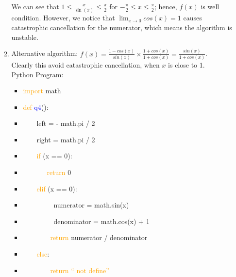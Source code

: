 \documentclass{article}
\begin{document}
\begin{enumerate}
\begin{enumerate}
\begin{center}
\begin{tikzpicture}[scale=1]
	\end{tikzpicture}
	\end{center} 
	We can see that  $ 1 \leq \frac{x}{\sin(x)} \leq \frac{\pi}{2}$ for $- \frac{\pi}{2} \leq x \leq \frac{\pi}{2}$; hence, $f(x)$ is well condition.
	However, we notice that $\lim_{x\to 0} cos(x) = 1$ causes catastrophic cancellation for the numerator, which means the algorithm is unstable.
	\item Alternative algorithm: $f(x) = \frac{1-cos(x)}{sin(x)} \times \frac{1+cos(x)}{1+cos(x)} = \frac{sin(x)}{1+cos(x)}$.\\
	Clearly this avoid catastrophic cancellation, when $x$ is close to 1.\\
	Python Program:
	\begin{itemize} [label={}]
	\item \textcolor{orange} {import} math
	\item \textcolor{orange} {def} \textcolor{blue}{q4}():
	\item \ \ \ \  left = - math.pi / 2
	\item \ \ \ \ right = math.pi / 2
	\item  \ \ \ \ \textcolor{orange} {if} (x == 0):
	\item	\ \ \ \	\ \ \ \textcolor{orange} {return} 0
	\item  \ \ \ \ \textcolor{orange} {elif} (x == 0):
	\item \ \ \ \ \ \ \ \ \ numerator = math.sin(x)
	\item \ \ \ \ \ \ \ \ \  denominator = math.cos(x) + 1
	\item	\ \ \ \	\ \ \ \ \textcolor{orange} {return} numerator / denominator
	\item  \ \ \ \ \textcolor{orange} {else}:
	\item	\ \ \ \	\ \ \ \ \textcolor{orange} {return}  \textcolor{orange}{`` not define''}
	 	\end{itemize}	  
	\end{enumerate}
\end{enumerate}
\end{document}
